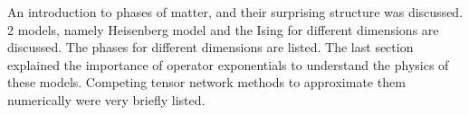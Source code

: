 An introduction to phases of matter, and their surprising structure was discussed. 2 models, namely Heisenberg model and the Ising for different dimensions are discussed. The phases for different dimensions are listed. The last section explained the importance of operator exponentials to understand the physics of these models. Competing tensor network methods to approximate them numerically were very briefly listed.